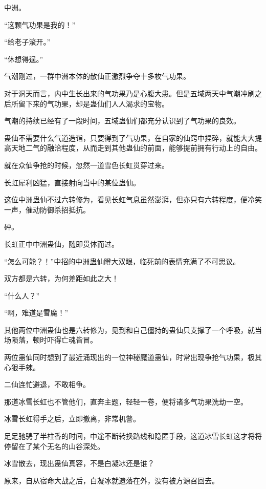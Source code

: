 
\begin{this_body}

中洲。

“这颗气功果是我的！”

“给老子滚开。”

“休想得逞。”

气潮刚过，一群中洲本体的散仙正激烈争夺十多枚气功果。

对于洞天而言，内中生长出来的气功果乃是心腹大患。但是五域两天中气潮冲刷之后所留下来的气功果，却是蛊仙们人人渴求的宝物。

气潮的持续已经有了一段时间，五域蛊仙们都充分认识到了气功果的良效。

蛊仙不需要什么气道造诣，只要得到了气功果，在自家的仙窍中捏碎，就能大大提高天地二气的融洽程度，从而走到其他蛊仙的前面，能够提前拥有行动上的自由。

就在众仙争抢的时候，忽然一道雪色长虹贯穿过来。

长虹犀利凶猛，直接射向当中的某位蛊仙。

这位中洲蛊仙不过六转修为，看见长虹气息虽然澎湃，但亦只有六转程度，便冷笑一声，催动防御杀招抵抗。

砰。

长虹正中中洲蛊仙，随即贯体而过。

“怎么可能？！”中招的中洲蛊仙瞪大双眼，临死前的表情充满了不可思议。

双方都是六转，为何差距如此之大！

“什么人？”

“啊，难道是雪魔！”

其他两位中洲蛊仙也是六转修为，见到和自己僵持的蛊仙只支撑了一个呼吸，就当场陨落，顿时吓得亡魂皆冒。

两位蛊仙同时想到了最近涌现出的一位神秘魔道蛊仙，时常出现争抢气功果，极其心狠手辣。

二仙连忙避退，不敢相争。

那道冰雪长虹也不管他们，直奔主题，轻轻一卷，便将诸多气功果洗劫一空。

冰雪长虹得手之后，立即撤离，非常机警。

足足驰骋了半柱香的时间，中途不断转换路线和隐匿手段，这道冰雪长虹这才将将停留在了某个无名的山谷深处。

冰雪散去，现出蛊仙真容，不是白凝冰还是谁？

原来，自从宿命大战之后，白凝冰就遗落在外，没有被方源召回去。


\end{this_body}

